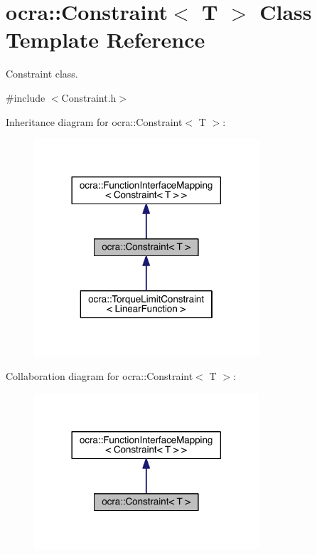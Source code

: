\hypertarget{classocra_1_1Constraint}{}\section{ocra\+:\+:Constraint$<$ T $>$ Class Template Reference}
\label{classocra_1_1Constraint}


Constraint class.  




{\ttfamily \#include $<$Constraint.\+h$>$}



Inheritance diagram for ocra\+:\+:Constraint$<$ T $>$\+:\nopagebreak
\begin{figure}[H]
\begin{center}
\leavevmode
\includegraphics[width=237pt]{d9/d1a/classocra_1_1Constraint__inherit__graph}
\end{center}
\end{figure}


Collaboration diagram for ocra\+:\+:Constraint$<$ T $>$\+:\nopagebreak
\begin{figure}[H]
\begin{center}
\leavevmode
\includegraphics[width=237pt]{d9/df5/classocra_1_1Constraint__coll__graph}
\end{center}
\end{figure}
